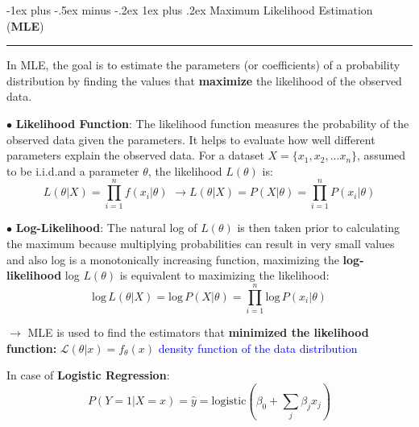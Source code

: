\documentclass[letterpaper, 10.5pt,landscape]{article}
\makeatletter
\renewcommand{\subsubsection}{\@startsection{subsubsection}{3}{0mm}%
                                {-1ex plus -.5ex minus -.2ex}%
                                {1ex plus .2ex}%
                                {\normalfont\small\bfseries}}
\makeatother
\begin{document}
\begin{multicols*}{3}
\vspace{2pt}
\subsubsection{Maximum Likelihood Estimation (\textbf{MLE})} {\color{teal}\hrule height 0.5pt} \smallskip
In MLE, the goal is to estimate the parameters (or coefficients) of a probability distribution by finding the values that \textbf{maximize} the likelihood of the observed data.

\vspace{3pt}
$\bullet$ \textbf{Likelihood Function}: The likelihood function measures the probability of the observed data given the parameters. It helps to evaluate how well different parameters explain the observed data.
For a dataset \(X = \{x_{1}, x_{2}, ... {x_n} \}\), assumed to be i.i.d.and a parameter $\theta$, the likelihood \(L(\theta)\) is: 
\vspace{-3pt}
\[\boxed{L\left(\theta | X \right) = \prod^{n}_{i=1} f\left(x_{i}|\theta \right) \hspace{4pt} \rightarrow L\left(\theta | X \right) = P\left(X | \theta \right) =  \prod^{n}_{i=1} P\left(x_{i}|\theta \right) }   \]

$\bullet$\textbf{ Log-Likelihood}:
The natural log of $L(\theta)$ is then taken prior to calculating the maximum because multiplying probabilities can result in very small values and also log is a monotonically increasing function, maximizing the \textbf{log-likelihood} log $L(\theta)$ is equivalent to maximizing the likelihood:
\vspace{-3pt}
\[\boxed{\text{log} \hspace{2pt} L\left(\theta | X \right) = \text{log} \hspace{2pt} P\left(X | \theta \right) =  \prod^{n}_{i=1} \text{log} \hspace{2pt} P\left(x_{i}|\theta \right) }   \]




$\rightarrow$ MLE is used to find the estimators that \textbf{minimized the likelihood function:} 
\(\mathcal{L}(\theta|x) = f_{\theta}(x) \) \hspace{5pt} \textcolor{blue}{density function of the data distribution}



\vspace{3pt}



In case of \textbf{Logistic Regression}:
\vspace{-10pt}
\[P\left(Y=1 | X=x \right) = \hat{y} = \text{logistic} \left(\beta_{0} + \sum_{j} \beta_{j}x_{j} \right)  \]
\vspace{-12pt}


\end{multicols*}
\end{document}
